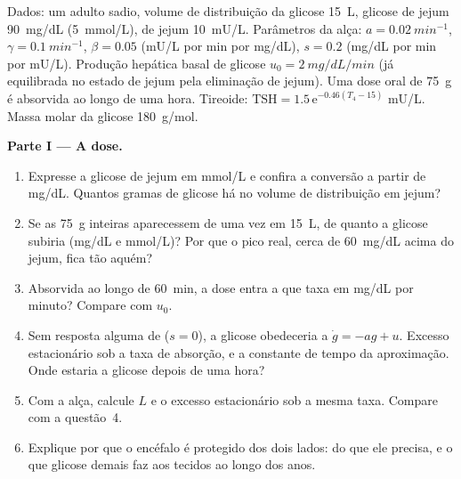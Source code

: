 \begin{problem}
\label{pb:b3:endocrinology:1}
Dados: um adulto sadio, volume de distribuição da glicose \qty{15}{L},
glicose de jejum \qty{90}{mg/dL} (\qty{5}{mmol/L}),  de jejum
\qty{10}{mU/L}. Parâmetros da alça: $a = \qty{0.02}{min^{-1}}$, $\gamma =
\qty{0.1}{min^{-1}}$, $\beta = 0.05$ (mU/L por min por mg/dL), $s = 0.2$
(mg/dL por min por mU/L). Produção hepática basal de glicose $u_{0} =
\qty{2}{mg/dL/min}$ (já equilibrada no estado de jejum pela eliminação
de jejum). Uma dose oral de \qty{75}{g} é absorvida ao longo de uma
hora. Tireoide: $\text{TSH} = 1.5\,\mathrm{e}^{-0.46(T_{4} - 15)}$ mU/L.
Massa molar da glicose \qty{180}{g/mol}.

\medskip
\noindent\textbf{Parte I --- A dose.}
\begin{enumerate}
  \item Expresse a glicose de jejum em mmol/L e confira a conversão a
        partir de mg/dL. Quantos gramas de glicose há no volume de
        distribuição em jejum?
  \item Se as \qty{75}{g} inteiras aparecessem de uma vez em \qty{15}{L},
        de quanto a glicose subiria (mg/dL e mmol/L)? Por que o pico
        real, cerca de \qty{60}{mg/dL} acima do jejum, fica tão aquém?
  \item Absorvida ao longo de \qty{60}{min}, a dose entra a que taxa em
        mg/dL por minuto? Compare com $u_{0}$.
  \item Sem resposta alguma de  ($s = 0$), a glicose obedeceria a
        $\dot
        g = -a g + u$. Excesso estacionário sob a taxa de absorção,
        e a constante de tempo da aproximação. Onde estaria a glicose
        depois de uma hora?
  \item Com a alça, calcule $L$ e o excesso estacionário sob a mesma
        taxa. Compare com a questão~4.
  \item Explique por que o encéfalo é protegido dos dois lados: do que
        ele precisa, e o que glicose demais faz aos tecidos ao longo dos
        anos.
\end{enumerate}


\end{problem}

